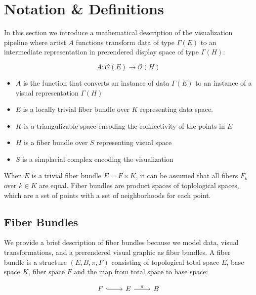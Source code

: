 \documentclass[../main.tex]{subfiles}
\begin{document}
\section{Notation \& Definitions}
In this section we introduce a mathematical description of the visualization pipeline where artist $A$ functions transform data of type $\Gamma(E)$ to an intermediate representation in prerendered display space of type $\Gamma(H)$:

\begin{equation}
    \label{eq:artist}
    A: \mathcal{O}(E) \rightarrow \mathcal{O}(H)
\end{equation}

\begin{itemize}
\item $A$ is the function that converts an instance of data $\Gamma(E)$ to an instance of a visual representation $\Gamma(H)$ 
\item $E$ is a locally trivial fiber bundle over $K$ representing data space.
\item $K$ is a triangulizable space encoding the connectivity of the points in $E$
\item $H$ is a fiber bundle over $S$ representing visual space
\item $S$ is a simplacial complex encoding the visualization
\end{itemize}

When $E$ is a trivial fiber bundle $E = F \times K$, it can be assumed that all fibers $F_{k}$ over $k \in K$ are equal. Fiber bundles are product spaces of toplological spaces, which are a set of points with a set of neighborhoods for each point\cite{FiberBundle2020, rowlandFiberBundle}.

\subsection{Fiber Bundles}
We provide a brief description of fiber bundles because we model data, visual transformations, and a prerendered visual graphic as fiber bundles. A fiber bundle is a structure $(E, B, \pi, F)$  consisting of topological total space $E$, base space $K$, fiber space $F$ and the map from total space to base space:

\begin{equation}
    \label{eq:fiber_bundle}
    \begin{tikzcd}
        F \arrow[r, hook] & E \arrow[r, "\pi"] & B
    \end{tikzcd}
\end{equation}
\end{document}
